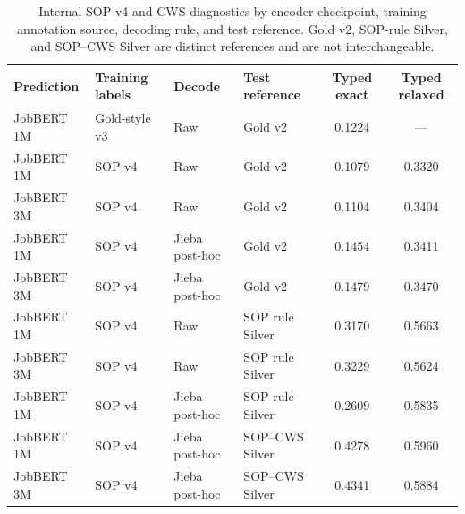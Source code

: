 \begin{table}[htbp]
\caption{Internal SOP-v4 and CWS diagnostics by encoder checkpoint, training annotation source, decoding rule, and test reference. Gold v2, SOP-rule Silver, and SOP--CWS Silver are distinct references and are not interchangeable.}
\label{tab:sop-diagnostic}
\centering
\scriptsize
\begin{tabularx}{\textwidth}{@{}P{0.15\textwidth}P{0.12\textwidth}P{0.13\textwidth}Lcc@{}}
\toprule
\textbf{Prediction} & \textbf{Training labels} & \textbf{Decode} & \textbf{Test reference} & \textbf{Typed exact} & \textbf{Typed relaxed} \\
\midrule
JobBERT 1M & Gold-style v3 & Raw & Gold v2 & 0.1224 & --- \\
JobBERT 1M & SOP v4 & Raw & Gold v2 & 0.1079 & 0.3320 \\
JobBERT 3M & SOP v4 & Raw & Gold v2 & 0.1104 & 0.3404 \\
JobBERT 1M & SOP v4 & Jieba post-hoc & Gold v2 & 0.1454 & 0.3411 \\
JobBERT 3M & SOP v4 & Jieba post-hoc & Gold v2 & 0.1479 & 0.3470 \\
JobBERT 1M & SOP v4 & Raw & SOP rule Silver & 0.3170 & 0.5663 \\
JobBERT 3M & SOP v4 & Raw & SOP rule Silver & 0.3229 & 0.5624 \\
JobBERT 1M & SOP v4 & Jieba post-hoc & SOP rule Silver & 0.2609 & 0.5835 \\
JobBERT 1M & SOP v4 & Jieba post-hoc & SOP--CWS Silver & 0.4278 & 0.5960 \\
JobBERT 3M & SOP v4 & Jieba post-hoc & SOP--CWS Silver & 0.4341 & 0.5884 \\
\bottomrule
\end{tabularx}
\end{table}
